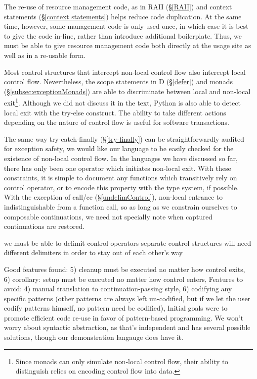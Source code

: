 \documentclass[11pt]{article}
\begin{document}
The re-use of resource management code, as in RAII (\S\ref{RAII}) and context statements (\S\ref{context statements}) helps reduce code duplication.
At the same time, however, some management code is only used once, in which case it is best to give the code in-line, rather than introduce additional boilerplate.
Thus, we must be able to give resource management code both directly at the usage site as well as in a re-usable form.

Most control structures that intercept non-local control flow also intercept local control flow.
Nevertheless, the scope statements in D (\S\ref{defer}) and monads (\S\ref{subsec:exceptionMonads}) are able to discriminate between local and non-local exit\footnote{Since monads can only simulate non-local control flow, their ability to distinguish relies on encoding control flow into data.}.
Although we did not discuss it in the text, Python is also able to detect local exit with the try-else construct.\cite{pythonDocs}
The ability to take different actions depending on the nature of control flow is useful for software transactions.

The same way try-catch-finally (\S\ref{try-finally}) can be straightforwardly audited for exception safety, we would like our language to be easily checked for the existence of non-local control flow.
In the languages we have discussed so far, there has only been one operator which initiates non-local exit.
With these constraints, it is simple to document any functions which transitively rely on control operator, or to encode this property with the type system, if possible.
With the exception of call/cc (\S\ref{undelimControl}), non-local entrance to indistinguishable from a function call, so as long as we constrain ourselves to composable continuations, we need not specially note when captured continuations are restored.


we must be able to delimit control operators
separate control structures will need different delimiters in order to stay out of each other's way


Good features found:
  5) cleanup must be executed no matter how control exits,
  6) corollary: setup must be executed no matter how control enters,
Features to avoid:
  4) manual translation to continuation-passing style,
  6) codifying any specific patterns (other patterns are always left un-codified, but if we let the user codify patterns himself, no pattern need be codified),
Initial goals were to promote efficient code re-use in favor of pattern-based programming.
We won't worry about syntactic abstraction, as that's independent and has several possible solutions, though our demonstration langauge does have it.
\end{document}
